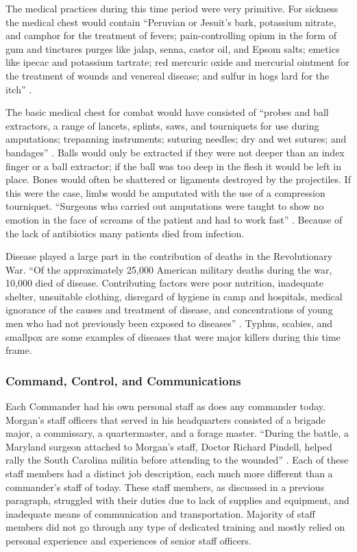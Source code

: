 The medical practices during this time period were very primitive.  For sickness
the medical chest would contain “Peruvian or Jesuit’s bark, potassium nitrate,
and camphor for the treatment of fevers; pain-controlling opium in the form of
gum and tinctures purges like jalap, senna, castor oil, and Epsom salts; emetics
like ipecac and potassium tartrate; red mercuric oxide and mercurial ointment
for the treatment of wounds and venereal disease; and sulfur in hogs lard for
the itch” \cite[p. 170]{stephenson_patriot_2007}.  

	   The basic medical chest for combat would have consisted of “probes
and ball extractors, a range of lancets, splints, saws, and tourniquets for use
during amputations; trepanning instruments; suturing needles; dry and wet
sutures; and bandages” \cite[p.170]{stephenson_patriot_2007}.  Balls would only be extracted if
they were not deeper than an index finger or a ball extractor; if the ball was
too deep in the flesh it would be left in place.  Bones would often be shattered
or ligaments destroyed by the projectiles.  If this were the case, limbs would
be amputated with the use of a compression tourniquet.  “Surgeons who carried
out amputations were taught to show no emotion in the face of screams of the
patient and had to work fast” \cite[p.171]{stephenson_patriot_2007}.   Because of the lack of
antibiotics many patients died from infection.  

Disease played a large part in the contribution of deaths in the Revolutionary
War.  “Of the approximately 25,000 American military deaths during the war,
10,000 died of disease.  Contributing factors were poor nutrition, inadequate
shelter, unsuitable clothing, disregard of hygiene in camp and hospitals,
medical ignorance of the causes and treatment of disease, and concentrations of
young men who had not previously been exposed to diseases”
\cite[p.173]{stephenson_patriot_2007}.
Typhus, scabies, and smallpox are some examples of diseases that were major
killers during this time frame.

\subsubsection{Command, Control, and Communications}

Each Commander had his own personal staff as does any commander today.  Morgan’s
staff officers that served in his headquarters consisted of a brigade major, a
commissary, a quartermaster, and a forage master.  “During the battle, a
Maryland surgeon attached to Morgan’s staff, Doctor Richard Pindell, helped
rally the South Carolina militia before attending to the wounded”
\cite[25]{babits_devil_2001}.  Each of these staff members had a distinct job description, each much
more different than a commander’s staff of today.  These staff members, as
discussed in a previous paragraph, struggled with their duties due to lack of
supplies and equipment, and inadequate means of communication and
transportation.  Majority of staff members did not go through any type of
dedicated training and mostly relied on personal experience and experiences of
senior staff officers.  


